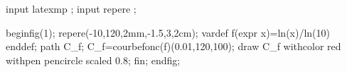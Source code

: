 input latexmp ;
input repere ;

beginfig(1);
repere(-10,120,2mm,-1.5,3,2cm);
vardef f(expr x)=ln(x)/ln(10) enddef;
path C_f;
C_f=courbefonc(f)(0.01,120,100);
draw C_f withcolor red withpen pencircle scaled 0.8;
fin;
endfig;